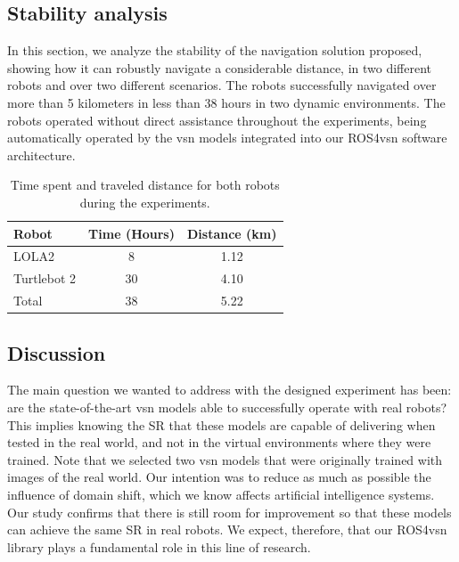 \subsection{Stability analysis}
\label{subsec:marathon}

In this section, we analyze the stability of the navigation solution proposed, showing how it can robustly navigate a considerable distance, in two different robots and over two different scenarios.
The robots successfully navigated over more than 5 kilometers in less than 38 hours in two dynamic environments.
The robots operated without direct assistance throughout the experiments, being automatically operated by the \acrshort{vsn} models integrated into our ROS4\acrshort{vsn} software architecture.

\begin{table}
    \centering
    \begin{tabular}{l|cc}
        \toprule
        \textbf{Robot} & Time (Hours) & Distance (km) \\
        \midrule
        LOLA2       & 8     & 1.12 \\
        Turtlebot 2 & 30    & 4.10 \\\midrule
        Total       & 38    & 5.22 \\
        \bottomrule
    \end{tabular}
    \caption{Time spent and traveled distance for both robots during the experiments.}
    \label{tab:stability}
\end{table}

\subsection{Discussion}
\label{subsec:discussion}
The main question we wanted to address with the designed experiment has been: are the state-of-the-art \acrshort{vsn} models able to successfully operate with real robots?
This implies knowing the SR that these models are capable of delivering when tested in the real world, and not in the virtual environments where they were trained.
Note that we selected two \acrshort{vsn} models that were originally trained with images of the real world.
Our intention was to reduce as much as possible the influence of domain shift, which we know affects artificial intelligence systems.
Our study confirms that there is still room for improvement so that these models can achieve the same SR in real robots.
We expect, therefore, that our ROS4\acrshort{vsn} library plays a fundamental role in this line of research.

